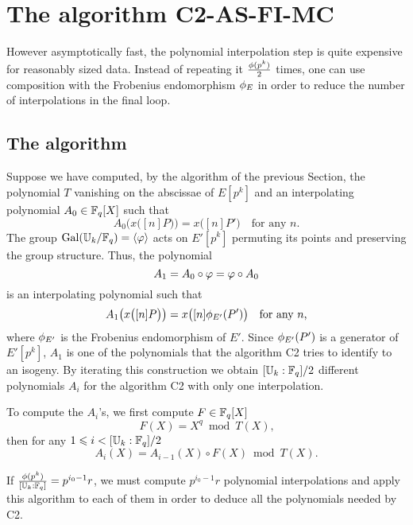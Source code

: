 \section{The algorithm C2-AS-FI-MC}
\label{sec:C2-AS-FI-MC}

However asymptotically fast, the polynomial interpolation step is
quite expensive for reasonably sized data. Instead of repeating it
$\frac{\phi(p^k)}{2}$ times, one can use composition with the
Frobenius endomorphism $\phi_E$ in order to reduce the number of
interpolations in the final loop.

\subsection{The algorithm}
Suppose we have computed, by the algorithm of the previous Section,
the polynomial $T$ vanishing on the abscissae of $E[p^k]$ and an
interpolating polynomial $A_0\in\mathbb{F}_q[X]$ such that
\begin{equation*}
  A_0\bigl(x\bigl([n]P\bigr)\bigr) = x\bigl([n]P'\bigr)
  \quad\text{for any $n$.}
\end{equation*}
The group $\operatorname{Gal}(\mathbb{U}_k/\mathbb{F}_q) = \langle\varphi\rangle$ acts on $E'[p^k]$
permuting its points and preserving the group structure. Thus, the
polynomial
\begin{equation*}
  A_1 = A_0\circ\varphi = \varphi\circ A_0
\end{equation*}
is an interpolating polynomial such that
\begin{equation*}
  A_1\bigl(x\bigl([n]P\bigr)\bigr) = x\bigl([n]\phi_{E'}(P')\bigr)
  \quad\text{for any $n$,}
\end{equation*}
where $\phi_{E'}$ is the Frobenius endomorphism of $E'$.  Since
$\phi_{E'}(P')$ is a generator of $E'[p^k]$, $A_1$ is one of the
polynomials that the algorithm C2 tries to identify to an isogeny. By
iterating this construction we obtain $[\mathbb{U}_k:\mathbb{F}_q]/2$ different
polynomials $A_i$ for the algorithm C2 with only one interpolation.

To compute the $A_i$'s, we first compute $F\in\mathbb{F}_q[X]$
\begin{equation}
  \label{eq:frob}
  F(X) = X^q \bmod T(X)
  \text{,}
\end{equation}
then for any $1\leqslant i<[\mathbb{U}_k:\mathbb{F}_q]/2$
\begin{equation}
  \label{eq:modcomp}
  A_i(X) = A_{i-1}(X)\circ F(X) \bmod T(X)\text{.}
\end{equation}

If $\frac{\phi(p^k)}{[\mathbb{U}_k:\mathbb{F}_q]} = p^{i_0-1}r$, we must compute
$p^{i_0-1}r$ polynomial interpolations and apply this algorithm to
each of them in order to deduce all the polynomials needed by C2.


